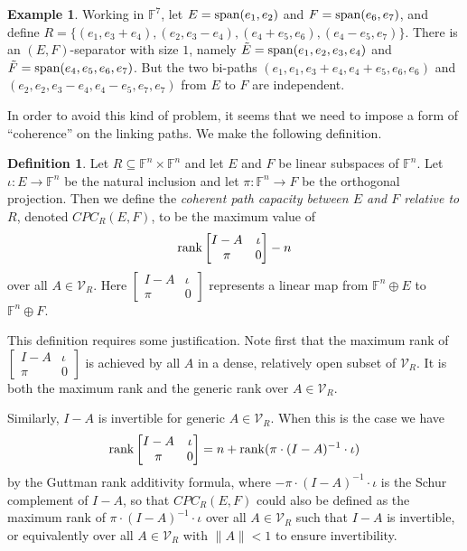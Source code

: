 \documentclass{amsart}
\theoremstyle{definition}
\newtheorem{defn}[thm]{Definition}
\newtheorem{exmp}[thm]{Example}
\begin{document}
\begin{exmp}
Working in $\mathbb{F}^7$, let $E = {\rm span}(e_1, e_2)$ and $F = {\rm span}(e_6, e_7)$, and define $R = \{(e_1, e_3 + e_4), (e_2, e_3 - e_4), (e_4 + e_5, e_6), (e_4 - e_5, e_7)\}$. There is an $(E,F)$-separator with size $1$, namely $\tilde{E} = {\rm span}(e_1, e_2, e_3, e_4)$ and $\tilde{F} = {\rm span}(e_4, e_5, e_6, e_7)$. But the two bi-paths $(e_1, e_1, e_3 + e_4, e_4 + e_5, e_6, e_6)$ and $(e_2, e_2, e_3 - e_4, e_4 - e_5, e_7, e_7)$ from $E$ to $F$ are independent.
\end{exmp}

In order to avoid this kind of problem, it seems that we need to impose a form of ``coherence'' on the linking paths. We make the following definition.

\begin{defn}
Let $R \subseteq \mathbb{F}^n \times \mathbb{F}^n$ and let $E$ and $F$ be linear subspaces of $\mathbb{F}^n$. Let $\iota: E \to \mathbb{F}^n$ be the natural inclusion and let $\pi: \mathbb{F}^n \to F$ be the orthogonal projection. Then we define the {\it coherent path capacity between $E$ and $F$ relative to $R$}, denoted $CPC_R(E,F)$, to be the maximum value of $${\rm rank}\left[\begin{matrix}I - A& \iota\\ \pi&0\end{matrix}\right] - n$$ over all $A \in \mathcal{V}_R$. Here $\left[\begin{matrix}I - A& \iota\\ \pi&0\end{matrix}\right]$ represents a linear map from $\mathbb{F}^n \oplus E$ to $\mathbb{F}^n \oplus F$.
\end{defn}

This definition requires some justification. Note first that the maximum rank of $\left[\begin{matrix}I - A& \iota\\ \pi&0\end{matrix}\right]$ is achieved by all $A$ in a dense, relatively open subset of $\mathcal{V}_R$. It is both the maximum rank and the generic rank over $A \in \mathcal{V}_R$.

Similarly, $I - A$ is invertible for generic $A \in \mathcal{V}_R$. When this is the case we have $${\rm rank}\left[\begin{matrix}I - A& \iota\\ \pi&0\end{matrix}\right] = n + {\rm rank}(\pi\cdot(I - A)^{-1}\cdot \iota)$$ by the Guttman rank additivity formula, where $-\pi\cdot(I - A)^{-1}\cdot \iota$ is the Schur complement of $I - A$, so that $CPC_R(E, F)$ could also be defined as the maximum rank of $\pi\cdot (I - A)^{-1}\cdot \iota$ over all $A \in \mathcal{V}_R$ such that $I - A$ is invertible, or equivalently over all $A \in \mathcal{V}_R$ with $\|A\| < 1$ to ensure invertibility.
\end{document}
